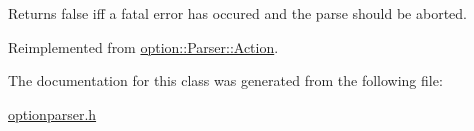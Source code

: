 Returns {\ttfamily false} iff a fatal error has occured and the parse should be aborted. 

Reimplemented from \hyperlink{structoption_1_1_parser_1_1_action_a176b5f783bb35eb015b6d2c09422457d}{option\+::\+Parser\+::\+Action}.



The documentation for this class was generated from the following file\+:\begin{DoxyCompactItemize}
\item 
\hyperlink{optionparser_8h}{optionparser.\+h}\end{DoxyCompactItemize}
